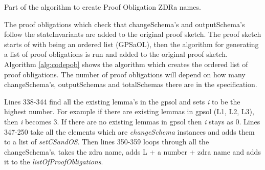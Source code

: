 
\begin{algorithm}[h]     \BlankLine {}
 
\caption{Part of the algorithm to create Proof Obligation ZDRa names. \label{alg:codepob}}
\end{algorithm}

The proof obligations which check that changeSchema's and outputSchema's follow
the stateInvariants are added to the original proof sketch. 
The proof sketch starts of with being an ordered list (GPSaOL), then the
algorithm for generating a list of proof obligations is run and added to the
original proof sketch. Algorithm \ref{alg:codepob} shows the algorithm which
creates the ordered list of proof obligations.
The number of proof obligations will depend on how many changeSchema's, 
outputSchemas and totalSchemas there are in the specification.

Lines 338-344 find all the existing lemma's in the \gls{gpsol} and sets \emph{i}
to be the highest number. For example if there are existing lemmas in
\gls{gpsol} (L1, L2, L3), then \emph{i} becomes 3. If there are no existing
lemmas in \gls{gpsol} then \emph{i} stays as 0. Lines 347-250 take all the
elements which are \emph{changeSchema} instances and adds them to a list of
\emph{setCSandOS}. Then lines 350-359 loops through all the changeSchema's,
takes the \gls{zdra} name, adds L + a number + \gls{zdra} name and adds it to
the \emph{listOfProofObligations}.

